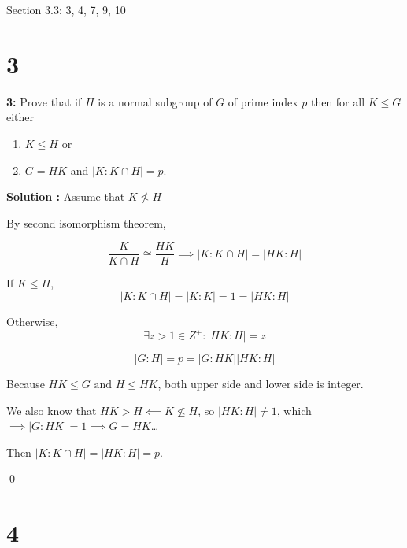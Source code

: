 \documentclass[11pt]{article}
\newcommand{\AND}{\text{ and }}
\newenvironment{exercise}[1]
	{\noindent \textbf{#1:}}
	{\par \vspace{0.5\baselineskip}}
\newenvironment{solution}[1][\unskip]
	{\noindent \textbf{Solution #1:} }
	{\qed \pagebreak}
\begin{document}


\begin{center}
\end{center}



Section 3.3: 3, 4, 7, 9, 10

\section*{3}

\begin{exercise}{3}
	Prove that if $H$ is a normal subgroup of $G$ of prime index $p$ then for all $K \le G$ either
	\begin{enumerate}
		\item $K\leqslant H$ or
		\item $G=HK$ and $|K:K \cap H| = p$.
	\end{enumerate}
\end{exercise}

\begin{solution}
	Assume that $K \not\le H$

	By second isomorphism theorem,

	\[
		\frac{K}{K \cap H} \cong \frac{HK}{H}
		\implies |K:K \cap H| = |HK:H|
	\]

	If $K \le H$,
	\[
		|K:K \cap H| = |K:K| = 1 = |HK : H|
	\]

	Otherwise,
	\[
		\exists z > 1 \in Z^+ : |HK : H| = z
	\]

	\[
		|G : H| = p = {|G : HK|}{|HK : H|}
	\]

	Because $HK \le G \AND H \le HK$, both upper side and lower side is integer.

	We also know that $HK > H \impliedby K \not\le H$,
	so $|HK : H| \neq 1$,
	which $\implies |G:HK|=1 \implies G = HK$\dots

	Then $|K : K \cap H| = |HK : H| = p$.

\end{solution}

\section*{4}
\end{document}

